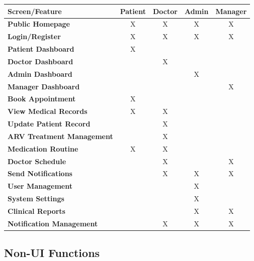 \documentclass[12pt,a4paper]{article}
\begin{document}
\begin{longtable}{|p{3.5cm}|c|c|c|c|}
\hline
\textbf{Screen/Feature} & \textbf{Patient} & \textbf{Doctor} & \textbf{Admin} & \textbf{Manager} \\
\hline
\textbf{Public Homepage} & X & X & X & X \\
\hline
\textbf{Login/Register} & X & X & X & X \\
\hline
\textbf{Patient Dashboard} & X & & & \\
\hline
\textbf{Doctor Dashboard} & & X & & \\
\hline
\textbf{Admin Dashboard} & & & X & \\
\hline
\textbf{Manager Dashboard} & & & & X \\
\hline
\textbf{Book Appointment} & X & & & \\
\hline
\textbf{View Medical Records} & X & X & & \\
\hline
\textbf{Update Patient Record} & & X & & \\
\hline
\textbf{ARV Treatment Management} & & X & & \\
\hline
\textbf{Medication Routine} & X & X & & \\
\hline
\textbf{Doctor Schedule} & & X & & X \\
\hline
\textbf{Send Notifications} & & X & X & X \\
\hline
\textbf{User Management} & & & X & \\
\hline
\textbf{System Settings} & & & X & \\
\hline
\textbf{Clinical Reports} & & & X & X \\
\hline
\textbf{Notification Management} & & X & X & X \\
\hline
\end{longtable}

\subsection{Non-UI Functions}
\end{document}
